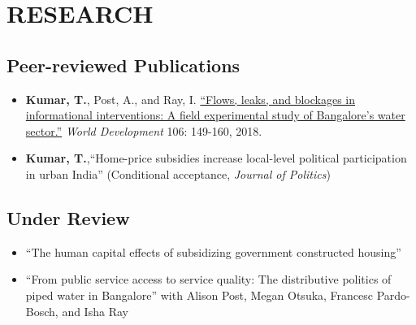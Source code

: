 \documentclass[11pt]{article}
\begin{document}
\section*{RESEARCH}



\subsection*{Peer-reviewed Publications}
\begin{itemize}
		\item[] \textbf{Kumar, T.}, Post, A., and Ray, I. \href{https://www.sciencedirect.com/science/article/pii/S0305750X1830032}{``Flows, leaks, and blockages in informational interventions: A field experimental study of Bangalore's water sector.''} \textit{World Development} 106: 149-160, 2018.
		
			\item[] \textbf{Kumar, T.},``Home-price subsidies increase local-level political participation in urban India'' (Conditional acceptance, \textit{Journal of Politics})
\end{itemize}

\subsection*{Under Review}

\begin{itemize}

	\item[]``The human capital effects of subsidizing government constructed housing'' 

	
		\item[]``From public service access to service quality: The distributive politics of piped water in Bangalore'' with Alison Post, Megan Otsuka, Francesc Pardo-Bosch, and Isha Ray 
	
		\end{itemize}
		
\end{document}
